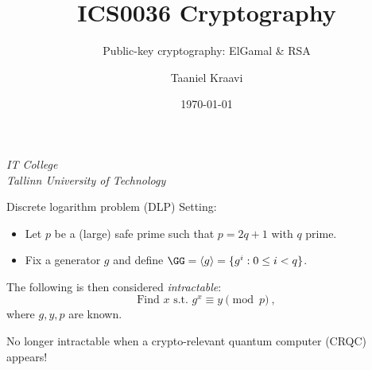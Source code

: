 \graphicspath{ {../../images/} }
\usetikzlibrary{external}

\usepackage{fancyvrb}

\title{ICS0036 Cryptography}
\subtitle{Public-key cryptography: ElGamal \& RSA}
\date{\today}
\author{Taaniel Kraavi}
\institute%
{%
  \textit{IT College}\\
  \textit{Tallinn University of Technology}
}


\begin{frame}
  \titlepage
\end{frame}

\begin{frame}{Discrete logarithm problem (DLP)}
  Setting:
  \begin{itemize}[<+(1)->]
    \item Let $p$ be a (large) safe prime such that $p = 2q + 1$ with $q$ prime.
    \item Fix a generator $g$ and define $\GG = \langle g \rangle = \{g^i :0 \le i < q\}$.
  \end{itemize}

  \vspace*{1em}

  \pause
  The following is then considered \emph{intractable}:
  \[
    \text{Find $x$ s.t. } g^x \equiv y \pmod{p}\ ,
  \]
  where $g, y, p$ are known.

  \pause
  No longer intractable when a crypto-relevant quantum computer (CRQC) appears!
\end{frame}

